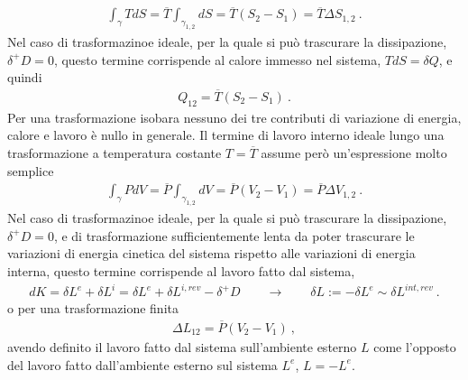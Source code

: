 \documentclass[letterpaper,10pt,italian]{jupyterBook}
\begin{document}
\begin{equation*}
\begin{split}\int_{\gamma} T dS = \overline{T} \int_{\gamma_{1,2}} d S = \overline{T} (S_2 - S_1) = \overline{T} \Delta S_{1,2} \ .\end{split}
\end{equation*}
\sphinxAtStartPar
Nel caso di trasformazinoe ideale, per la quale si può trascurare la dissipazione, \(\delta^+ D = 0\), questo termine corrispende al calore immesso nel sistema, \(T d S = \delta Q\), e quindi
\begin{equation*}
\begin{split}Q_{12} = \overline{T} (S_2 - S_1) \ .\end{split}
\end{equation*}
\sphinxAtStartPar
{} Per una trasformazione isobara nessuno dei tre contributi di variazione di energia, calore e lavoro è nullo in generale. Il termine di lavoro interno ideale lungo una trasformazione a temperatura costante \(T = \overline{T}\) assume però un’espressione molto semplice
\begin{equation*}
\begin{split}\int_{\gamma} P dV = \overline{P} \int_{\gamma_{1,2}} d V = \overline{P} (V_2 - V_1) = \overline{P} \Delta V_{1,2} \ .\end{split}
\end{equation*}
\sphinxAtStartPar
Nel caso di trasformazinoe ideale, per la quale si può trascurare la dissipazione, \(\delta^+ D = 0\), e di trasformazione sufficientemente lenta da poter trascurare le variazioni di energia cinetica del sistema rispetto alle variazioni di energia interna, questo termine corrispende al lavoro fatto dal sistema,
\begin{equation*}
\begin{split}d K = \delta L^e + \delta L^i = \delta L^e + \delta L^{i,rev} - \delta^+ D \qquad \rightarrow \qquad \delta L := - \delta L^e \sim \delta L^{int,rev} \ .\end{split}
\end{equation*}
\sphinxAtStartPar
o per una trasformazione finita
\begin{equation*}
\begin{split}\Delta L_{12} = \overline{P} (V_2 - V_1) \ ,\end{split}
\end{equation*}
\sphinxAtStartPar
avendo definito il lavoro fatto dal sistema sull’ambiente esterno \(L\) come l’opposto del lavoro fatto dall’ambiente esterno sul sistema \(L^e\), \(L = - L^e\).
\end{document}
